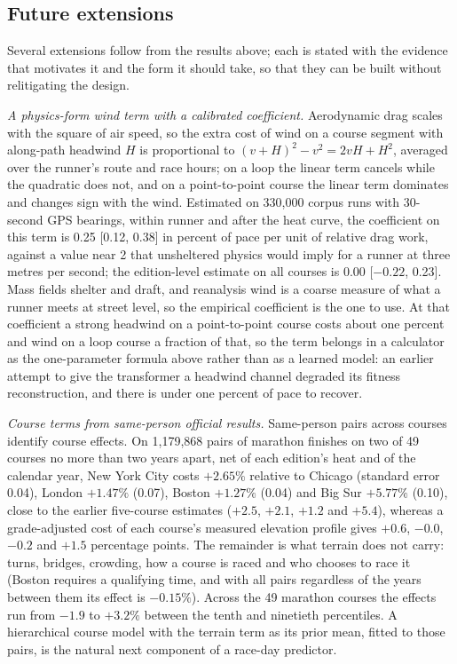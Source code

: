 \documentclass[11pt]{article}
\renewcommand{\_}{\textunderscore\allowbreak}
\begin{document}
\subsection{Future extensions}
\label{sec:future}

Several extensions follow from the results above; each is stated with the evidence that motivates it and the form it should take, so that they can be built without relitigating the design.

\emph{A physics-form wind term with a calibrated coefficient.} Aerodynamic drag scales with the square of air speed, so the extra cost of wind on a course segment with along-path headwind $H$ is proportional to $(v+H)^2 - v^2 = 2vH + H^2$, averaged over the runner's route and race hours; on a loop the linear term cancels while the quadratic does not, and on a point-to-point course the linear term dominates and changes sign with the wind. Estimated on 330{,}000 corpus runs with 30-second GPS bearings, within runner and after the heat curve, the coefficient on this term is 0.25 [0.12, 0.38] in percent of pace per unit of relative drag work, against a value near 2 that unsheltered physics would imply for a runner at three metres per second; the edition-level estimate on all courses is 0.00 [$-0.22$, 0.23]. Mass fields shelter and draft, and reanalysis wind is a coarse measure of what a runner meets at street level, so the empirical coefficient is the one to use. At that coefficient a strong headwind on a point-to-point course costs about one percent and wind on a loop course a fraction of that, so the term belongs in a calculator as the one-parameter formula above rather than as a learned model: an earlier attempt to give the transformer a headwind channel degraded its fitness reconstruction, and there is under one percent of pace to recover.

\emph{Course terms from same-person official results.} Same-person pairs across courses identify course effects. On 1{,}179{,}868 pairs of marathon finishes on two of 49 courses no more than two years apart, net of each edition's heat and of the calendar year, New York City costs $+2.65\%$ relative to Chicago (standard error 0.04), London $+1.47\%$ (0.07), Boston $+1.27\%$ (0.04) and Big Sur $+5.77\%$ (0.10), close to the earlier five-course estimates ($+2.5$, $+2.1$, $+1.2$ and $+5.4$), whereas a grade-adjusted cost of each course's measured elevation profile gives $+0.6$, $-0.0$, $-0.2$ and $+1.5$ percentage points. The remainder is what terrain does not carry: turns, bridges, crowding, how a course is raced and who chooses to race it (Boston requires a qualifying time, and with all pairs regardless of the years between them its effect is $-0.15\%$). Across the 49 marathon courses the effects run from $-1.9$ to $+3.2\%$ between the tenth and ninetieth percentiles. A hierarchical course model with the terrain term as its prior mean, fitted to those pairs, is the natural next component of a race-day predictor.
\end{document}
